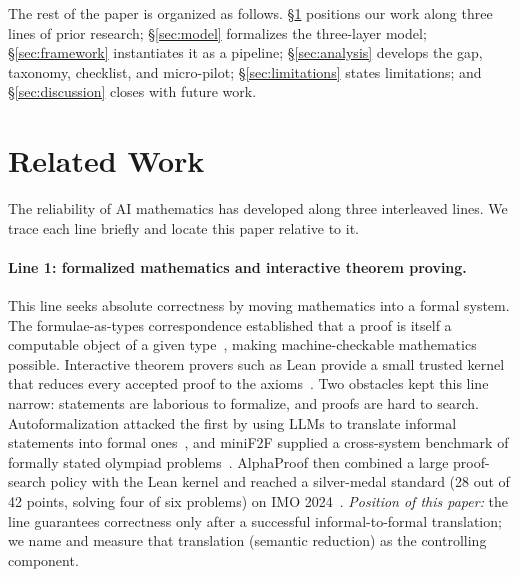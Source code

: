 \documentclass[11pt]{article}
\theoremstyle{definition}
\theoremstyle{plain}
\theoremstyle{remark}
\begin{document}
The rest of the paper is organized as follows. \S\ref{sec:related} positions our work
along three lines of prior research; \S\ref{sec:model} formalizes the three-layer model;
\S\ref{sec:framework} instantiates it as a pipeline; \S\ref{sec:analysis} develops the gap,
taxonomy, checklist, and micro-pilot; \S\ref{sec:limitations} states limitations; and
\S\ref{sec:discussion} closes with future work.

\section{Related Work}\label{sec:related}
The reliability of AI mathematics has developed along three interleaved lines. We trace each
line briefly and locate this paper relative to it.

\paragraph{Line 1: formalized mathematics and interactive theorem proving.}
This line seeks absolute correctness by moving mathematics into a formal system. The
formulae-as-types correspondence established that a proof is itself a computable object of a
given type~\cite{howard1980}, making machine-checkable mathematics possible. Interactive
theorem provers such as Lean provide a small trusted kernel that reduces every accepted proof
to the axioms~\cite{demoura2015,demoura2021}. Two obstacles kept this line narrow: statements
are laborious to formalize, and proofs are hard to search. Autoformalization attacked the
first by using LLMs to translate informal statements into formal ones~\cite{wu2022}, and
miniF2F supplied a cross-system benchmark of formally stated olympiad problems~\cite{zheng2022}.
AlphaProof then combined a large proof-search policy with the Lean kernel and reached a
silver-medal standard (28 out of 42 points, solving four of six problems) on
IMO 2024~\cite{hubert2025}. \emph{Position of this paper:} the line guarantees correctness
only after a successful informal-to-formal translation; we name and measure that translation
(semantic reduction) as the controlling component.
\end{document}
